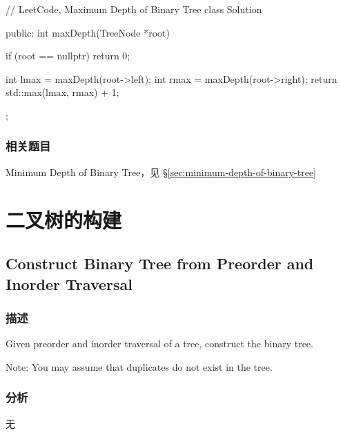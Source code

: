 \begin{Code}
// LeetCode, Maximum Depth of Binary Tree
class Solution {
public:
    int maxDepth(TreeNode *root) {
        if (root == nullptr) return 0;

        int lmax = maxDepth(root->left);
        int rmax = maxDepth(root->right);
        return std::max(lmax, rmax) + 1;
    }
};
\end{Code}


\subsubsection{相关题目}
\begindot
\item Minimum Depth of Binary Tree，见 \S \ref{sec:minimum-depth-of-binary-tree}
\myenddot


\section{二叉树的构建} %


\subsection{Construct Binary Tree from Preorder and Inorder Traversal}
\label{sec:construct-binary-tree-from-preorder-and-inorder-traversal}


\subsubsection{描述}
Given preorder and inorder traversal of a tree, construct the binary tree.

Note:
You may assume that duplicates do not exist in the tree.


\subsubsection{分析}
无


